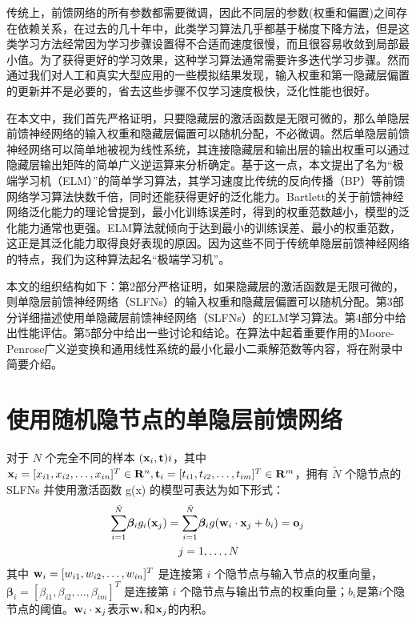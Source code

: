 \documentclass[conference]{IEEEtran}
\begin{document}
传统上，前馈网络的所有参数都需要微调，因此不同层的参数(权重和偏置)之间存在依赖关系，在过去的几十年中，此类学习算法几乎都基于梯度下降方法，但是这类学习方法经常因为学习步骤设置得不合适而速度很慢，而且很容易收敛到局部最小值。为了获得更好的学习效果，这种学习算法通常需要许多迭代学习步骤。然而通过我们对人工和真实大型应用的一些模拟结果发现，输入权重和第一隐藏层偏置的更新并不是必要的，省去这些步骤不仅学习速度极快，泛化性能也很好。

在本文中，我们首先严格证明，只要隐藏层的激活函数是无限可微的，那么单隐层前馈神经网络的输入权重和隐藏层偏置可以随机分配，不必微调。然后单隐层前馈神经网络可以简单地被视为线性系统，其连接隐藏层和输出层的输出权重可以通过隐藏层输出矩阵的简单广义逆运算来分析确定。基于这一点，本文提出了名为“极端学习机（ELM）”的简单学习算法，其学习速度比传统的反向传播（BP）等前馈网络学习算法快数千倍，同时还能获得更好的泛化能力。Bartlett的关于前馈神经网络泛化能力的理论曾提到，最小化训练误差时，得到的权重范数越小，模型的泛化能力通常也更强。ELM算法就倾向于达到最小的训练误差、最小的权重范数，这正是其泛化能力取得良好表现的原因。因为这些不同于传统单隐层前馈神经网络的特点，我们为这种算法起名“极端学习机”。

本文的组织结构如下：第2部分严格证明，如果隐藏层的激活函数是无限可微的，则单隐层前馈神经网络（SLFNs）的输入权重和隐藏层偏置可以随机分配。第3部分详细描述使用单隐藏层前馈神经网络（SLFNs）的ELM学习算法。第4部分中给出性能评估。第5部分中给出一些讨论和结论。在算法中起着重要作用的Moore-Penrose广义逆变换和通用线性系统的最小化最小二乘解范数等内容，将在附录中简要介绍。


\section{使用随机隐节点的单隐层前馈网络}

对于 $N$ 个完全不同的样本 $({\bf x}_i, {\bf t})i$，其中 ${\bf x}_i=[x_{i1},x_{i2},\dots,x_{in}]^T\in{\bf R}^n, {\bf t}_i=[t_{i1},t_{i2},\dots,t_{im}]^T\in{\bf R}^m$，拥有 $\tilde N$ 个隐节点的 SLFNs 并使用激活函数 g(x) 的模型可表达为如下形式：
\begin{equation}\label{eq1}
	\begin{split}
		\overset{\tilde{N}}{\underset{i=1}{\sum}}{{\bm{\beta}}_i}{g_i}({\bf{x}}_j)&=\overset{\tilde{N}}{\underset{i=1}{\sum}}{{\bm{\beta}}_i}g({{\bf{w}}_i}\cdot{{\bf{x}}_j}+b_i)={\bf{o}}_j\\
		&\quad j=1,\dots,N
	\end{split}
\end{equation}
其中 $ {\bf{w}}_i=[w_{i1},w_{i2},\dots,w_{in}]^T $ 是连接第 $i$ 个隐节点与输入节点的权重向量，$ {\bm{\beta}}_i=[\beta_{i1},\beta_{i2},\dots,\beta_{im}]^T $ 是连接第 $i$ 个隐节点与输出节点的权重向量；$b_i$是第$i$个隐节点的阈值。${{\bf{w}}_i}\cdot{{\bf{x}}_j}$表示${{\bf{w}}_i}$和${{\bf{x}}_j}$的内积。
\end{document}
